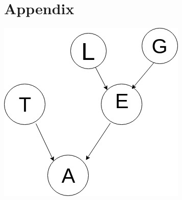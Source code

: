 \documentclass[12pt,letterpaper]{article}
\begin{document}
\section{Appendix}
	\includegraphics[width=\textwidth]{BayesNetwork}
	\centering
\end{document}
